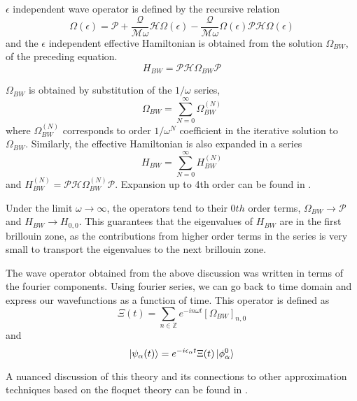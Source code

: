 $\epsilon$ independent wave operator is defined by the recursive relation
\begin{equation}
 \label{chap_5:omegabw}\Omega(\epsilon) = \mathcal{P} + \frac{\mathcal{Q}}{\mathcal{M}\omega}\mathcal{H}\Omega(\epsilon) - \frac{\mathcal{Q}}{\mathcal{M}\omega}\Omega(\epsilon)\mathcal{P}\mathcal{H}\Omega(\epsilon)
\end{equation} and the $\epsilon$ independent effective Hamiltonian is obtained from the solution $\Omega_{BW}$, of the preceding equation.
\begin{equation}
 H_{BW} = \mathcal{P}\mathcal{H}\Omega_{BW}\mathcal{P}
\end{equation}

$\Omega_{BW}$ is obtained by substitution of the $1/\omega$ series, 
\begin{equation*}
 \Omega_{BW} = \sum_{N=0}^{\infty}{\Omega_{BW}^{(N)}}
\end{equation*} where $\Omega_{BW}^{(N)}$ corresponds to order $1/\omega^N$ coefficient in the iterative solution to $\Omega_{BW}$. Similarly, the effective Hamiltonian
is also expanded in a series \begin{equation*}
 H_{BW} = \sum_{N=0}^{\infty}{H_{BW}^{(N)}}
\end{equation*} and $H_{BW}^{(N)} = \mathcal{P}\mathcal{H}\Omega_{BW}^{(N)}\mathcal{P}$. Expansion up to 4th order can be found in \parencite{mikami2016brillouin}.

Under the limit $\omega \rightarrow \infty$, the operators tend to their $0th$ order terms, $\Omega_{BW} \rightarrow \mathcal{P}$ and $H_{BW} \rightarrow H_{0,0}$. This guarantees that the eigenvalues of 
$H_{BW}$ are in the first brillouin zone, as the contributions from higher order terms in the series is very small to transport the eigenvalues to the next brillouin zone.

The wave operator obtained from the above discussion was written in terms of the fourier components. Using fourier series, we can go back to time domain and express our 
wavefunctions as a function of time. This operator is defined as
\begin{equation}
 \Xi(t) = \sum_{n\in\mathbb{Z}}{e^{-in\omega t}[\Omega_{BW}]_{n,0}}
\end{equation}
and
\begin{equation}
 \ket{\psi_{\alpha}(t)} = e^{-i\epsilon_\alpha t}\Xi(t)\ket{\phi_\alpha^0}
\end{equation}

A nuanced discussion of this theory and its connections to other approximation techniques based on the floquet theory can be found in \parencite{mikami2016brillouin}.
